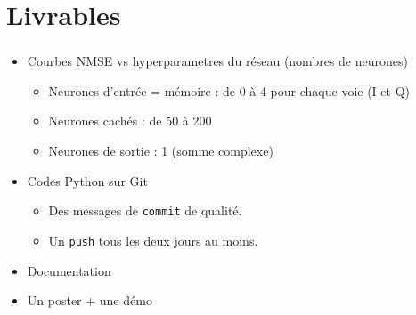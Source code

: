 \documentclass[aspectratio=169]{beamer}
\begin{document}
\section{Livrables}

\begin{frame}
  \frametitle{\insertsection}

  \begin{itemize}
    \item Courbes NMSE vs hyperparametres du réseau (nombres de neurones)
    \begin{itemize}
      \item Neurones d'entrée = mémoire : de 0 à 4 pour chaque voie (I et Q)
      \item Neurones cachés : de 50 à 200
      \item Neurones de sortie : 1 (somme complexe)
    \end{itemize}
    \item Codes Python sur Git
    \begin{itemize}
      \item Des messages de \texttt{commit} de qualité. 
      \item Un \texttt{push} tous les deux jours au moins. 
    \end{itemize}
    \item Documentation
    \item Un poster + une démo
  \end{itemize}

\end{frame}
\end{document}
